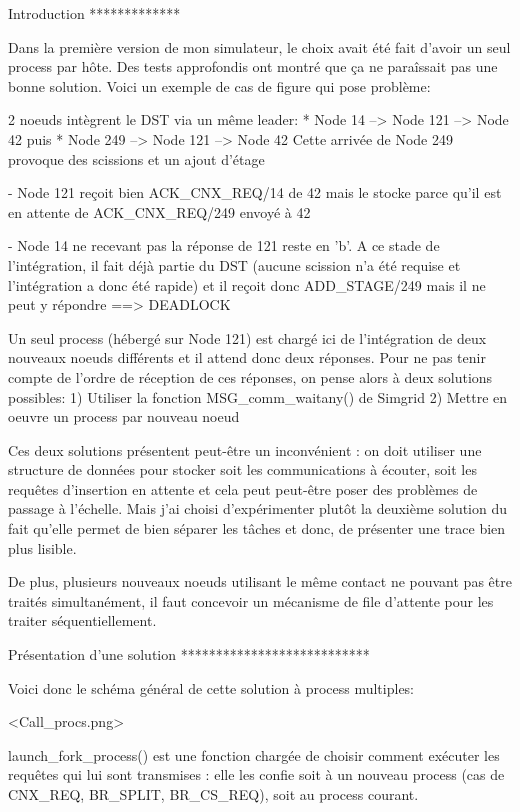 Introduction
*************

Dans la première version de mon simulateur, le choix avait été fait d'avoir un seul process par hôte. Des tests
approfondis ont montré que ça ne paraîssait pas une bonne solution. Voici un exemple de cas de figure qui pose problème:

2 noeuds intègrent le DST via un même leader:
 * Node 14 --> Node 121 --> Node 42
   puis
 * Node 249 --> Node 121 --> Node 42
   Cette arrivée de Node 249 provoque des scissions et un ajout d'étage

 - Node 121 reçoit bien ACK_CNX_REQ/14 de 42 mais le stocke parce qu'il est en attente de ACK_CNX_REQ/249 envoyé à 42

 - Node 14 ne recevant pas la réponse de 121 reste en 'b'. A ce stade de l'intégration, il fait déjà partie du DST
   (aucune scission n'a été requise et l'intégration a donc été rapide) et il reçoit donc ADD_STAGE/249 mais il ne peut
   y répondre ==> DEADLOCK

Un seul process (hébergé sur Node 121) est chargé ici de l'intégration de deux nouveaux noeuds différents et il attend
donc deux réponses. Pour ne pas tenir compte de l'ordre de réception de ces réponses, on pense alors à deux solutions
possibles:
1) Utiliser la fonction MSG_comm_waitany() de Simgrid
2) Mettre en oeuvre un process par nouveau noeud

Ces deux solutions présentent peut-être un inconvénient : on doit utiliser une structure de données pour stocker soit
les communications à écouter, soit les requêtes d'insertion en attente et cela peut peut-être poser des problèmes de
passage à l'échelle. Mais j'ai choisi d'expérimenter plutôt la deuxième solution du fait qu'elle permet de bien séparer
les tâches et donc, de présenter une trace bien plus lisible.

De plus, plusieurs nouveaux noeuds utilisant le même contact ne pouvant pas être traités simultanément, il faut
concevoir un mécanisme de file d'attente pour les traiter séquentiellement.

Présentation d'une solution
***************************

Voici donc le schéma général de cette solution à process multiples:

<Call_procs.png>

launch_fork_process() est une fonction chargée de choisir comment exécuter les requêtes qui lui sont transmises : elle
les confie soit à un nouveau process (cas de CNX_REQ, BR_SPLIT, BR_CS_REQ), soit au process courant.

